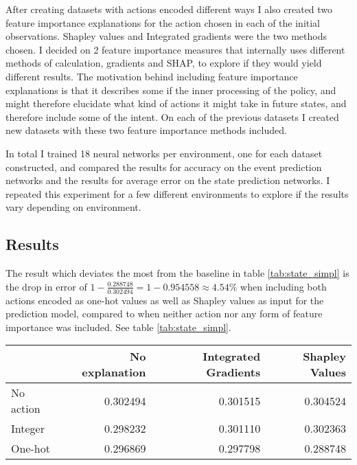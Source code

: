 \documentclass[UKenglish]{uiomasterthesis}
\begin{document}
After creating datasets with actions encoded different ways I also created two feature importance explanations for the action chosen in each of the initial observations. Shapley values and Integrated gradients were the two methods chosen. I decided on 2 feature importance measures that internally uses different methods of calculation, gradients and SHAP, to explore if they would yield different results. The motivation behind including feature importance explanations is that it describes some if the inner processing of the policy, and might therefore elucidate what kind of actions it might take in future states, and therefore include some of the intent. On each of the previous datasets I created new datasets with these two feature importance methods included.

In total I trained 18 neural networks per environment, one for each dataset constructed, and compared the results for accuracy on the event prediction networks and the results for average error on the state prediction networks. I repeated this experiment for a few different environments to explore if the results vary depending on environment.
\begin{figure}[!ht]
	
	\label{fig:pred_loss_action_ig} 
\end{figure}

\subsection{Results}

The result which deviates the most from the baseline in table \ref{tab:state_simpl} is the drop in error of $1 - \frac{0.288748}{0.302494} = 1 - 0.954558 \approx 4.54\%$ when including both actions encoded as one-hot values as well as Shapley values as input for the prediction model, compared to when neither action nor any form of feature importance was included. See table \ref{tab:state_simpl}.

\begin{center}
\label{tab:state_simpl}
\begin{tabular}{lrrr}
\toprule
 & No explanation & Integrated Gradients & Shapley Values \\
\midrule
No action & 0.302494 & 0.301515 & 0.304524 \\
Integer & 0.298232 & 0.301110 & 0.302363 \\
One-hot & 0.296869 & 0.297798 & 0.288748\\
\bottomrule
\end{tabular}
\end{center}
\end{document}
